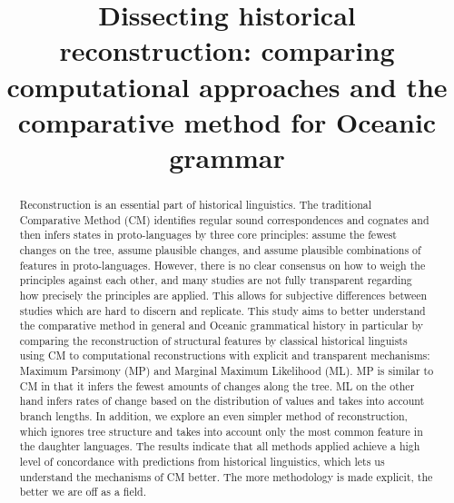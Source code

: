\documentclass[a4paper,10pt]{article} %
\title{Dissecting historical reconstruction: comparing computational approaches and the comparative method for Oceanic grammar}
\begin{document}
\def\code#1{\texttt{#1}}

\thispagestyle{empty}

\maketitle
\thispagestyle{empty}

\tableofcontents
\newpage




\begin{abstract}
Reconstruction is an essential part of historical linguistics. The traditional Comparative Method (CM) identifies regular sound correspondences and cognates and then infers states in proto-languages by three core principles: assume the fewest changes on the tree, assume plausible changes, and assume plausible combinations of features in proto-languages. However, there is no clear consensus on how to weigh the principles against each other, and many studies are not fully transparent regarding how precisely the principles are applied. This allows for subjective differences between studies which are hard to discern and replicate. This study aims to better understand the comparative method in general and Oceanic grammatical history in particular by comparing the reconstruction of structural features by classical historical linguists using CM to computational reconstructions with explicit and transparent mechanisms: Maximum Parsimony (MP) and Marginal Maximum Likelihood (ML). MP is similar to CM in that it infers the fewest amounts of changes along the tree. ML on the other hand infers rates of change based on the distribution of values and takes into account branch lengths. In addition, we explore an even simpler method of reconstruction, which ignores tree structure and takes into account only the most common feature in the daughter languages. The results indicate that all methods applied achieve a high level of concordance with predictions from historical linguistics, which lets us understand the mechanisms of CM better. The more methodology is made explicit, the better we are off as a field.




\end{abstract}
\end{document}
